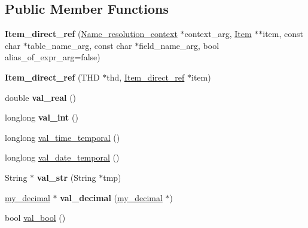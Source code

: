 \subsection*{Public Member Functions}
\begin{DoxyCompactItemize}
\item 
\mbox{\label{classItem__direct__ref_a8a1e4ccc5a7f86cd1af2de7403b2d2ee}} 
{\bfseries Item\+\_\+direct\+\_\+ref} (\mbox{\hyperlink{structName__resolution__context}{Name\+\_\+resolution\+\_\+context}} $\ast$context\+\_\+arg, \mbox{\hyperlink{classItem}{Item}} $\ast$$\ast$item, const char $\ast$table\+\_\+name\+\_\+arg, const char $\ast$field\+\_\+name\+\_\+arg, bool alias\+\_\+of\+\_\+expr\+\_\+arg=false)
\item 
\mbox{\label{classItem__direct__ref_a34559548748ad03a9fd467599f47b286}} 
{\bfseries Item\+\_\+direct\+\_\+ref} (T\+HD $\ast$thd, \mbox{\hyperlink{classItem__direct__ref}{Item\+\_\+direct\+\_\+ref}} $\ast$item)
\item 
\mbox{\label{classItem__direct__ref_a34351b19621f3b205729cbc00414bd2f}} 
double {\bfseries val\+\_\+real} ()
\item 
\mbox{\label{classItem__direct__ref_a0fe7e13245501de0405980925f01d11e}} 
longlong {\bfseries val\+\_\+int} ()
\item 
longlong \mbox{\hyperlink{classItem__direct__ref_af46d56da55778711183208f74fc592e9}{val\+\_\+time\+\_\+temporal}} ()
\item 
longlong \mbox{\hyperlink{classItem__direct__ref_a10fdb82072009fd9bc88657cbc49f282}{val\+\_\+date\+\_\+temporal}} ()
\item 
\mbox{\label{classItem__direct__ref_a2e1bcdedf999b37b28582f3badb4832a}} 
String $\ast$ {\bfseries val\+\_\+str} (String $\ast$tmp)
\item 
\mbox{\label{classItem__direct__ref_aa7b73585a2ad506b247fcf88bd46d486}} 
\mbox{\hyperlink{classmy__decimal}{my\+\_\+decimal}} $\ast$ {\bfseries val\+\_\+decimal} (\mbox{\hyperlink{classmy__decimal}{my\+\_\+decimal}} $\ast$)
\item 
bool \mbox{\hyperlink{classItem__direct__ref_ae552bb7da0a5629c75850d6d0e07d344}{val\+\_\+bool}} ()
$$
\end{DoxyCompactItemize}
